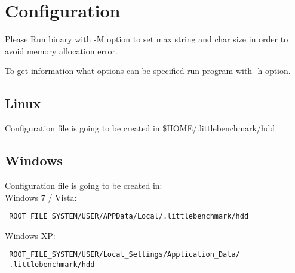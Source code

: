 \hypertarget{Configuration}{
\section{Configuration}
\label{Configuration}
}
Please Run binary with -M option to set max string and char size in order to avoid memory allocation error.

To get information what options can be specified run program with -h option.
\subsection{Linux}
Configuration file is going to be created in \$HOME/.littlebenchmark/hdd
\subsection{Windows}
Configuration file is going to be created in:\\
Windows 7 / Vista: \begin{verbatim} ROOT_FILE_SYSTEM/USER/APPData/Local/.littlebenchmark/hdd \end{verbatim}
Windows XP: \begin{verbatim} ROOT_FILE_SYSTEM/USER/Local_Settings/Application_Data/
 .littlebenchmark/hdd \end{verbatim}
